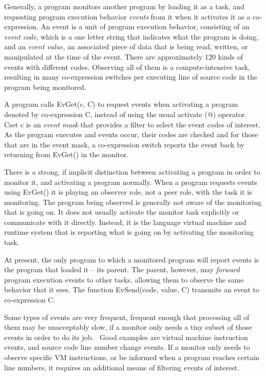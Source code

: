 Generally, a program monitors another program by loading it as a task,
and requesting program execution behavior \textit{events} from it when
it activates it as a co-expression. An event is a unit of program
execution behavior, consisting of an \textit{event code}, which is a
one letter string that indicates what the program is doing, and an
\textit{event value}, an associated piece of data that is being read,
written, or manipulated at the time of the event. There are
approximately 120 kinds of events with different codes. Observing all
of them is a compute-intensive task, resulting in many co-expression
switches per executing line of source code in the program being
monitored.

A program calls \textsf{EvGet(c, C)} to request events when activating a
program denoted by co-expression \textsf{C}, instead of using the usual
activate (\textsf{@}) operator. Cset \textsf{c} is an \textit{event
mask} that provides a filter to select the event codes of interest. As
the program executes and events occur, their codes are checked and for
those that are in the event mask, a co-expression switch reports the
event back by returning from \textsf{EvGet()} in the monitor.

There is a strong, if implicit distinction between activating a program
in order to monitor it, and activating a program normally. When a
program requests events using \textsf{EvGet()} it is playing an
observer role, not a peer role, with the task it is monitoring. The
program being observed is generally not aware of the monitoring that is
going on. It does not usually activate the monitor task explicitly or
communicate with it directly. Instead, it is the language virtual
machine and runtime system that is reporting what is going on by
activating the monitoring task.

At present, the only program to which a monitored program will report
events is the program that loaded it -- its parent. The parent,
however, may \textit{forward} program execution events to other tasks,
allowing them to observe the same behavior that it sees. The function
\textsf{EvSend(code, value, C)} transmits an event to co-expression
\textsf{C}.

Some types of events are very frequent, frequent enough that processing
all of them may be unacceptably slow, if a monitor only needs a tiny
subset of those events in order to do its job. \ Good examples are
virtual machine instruction events, and source code line number change
events. If a monitor only needs to observe specific VM instructions, or
be informed when a program reaches certain line numbers, it requires an
additional means of filtering events of interest.

